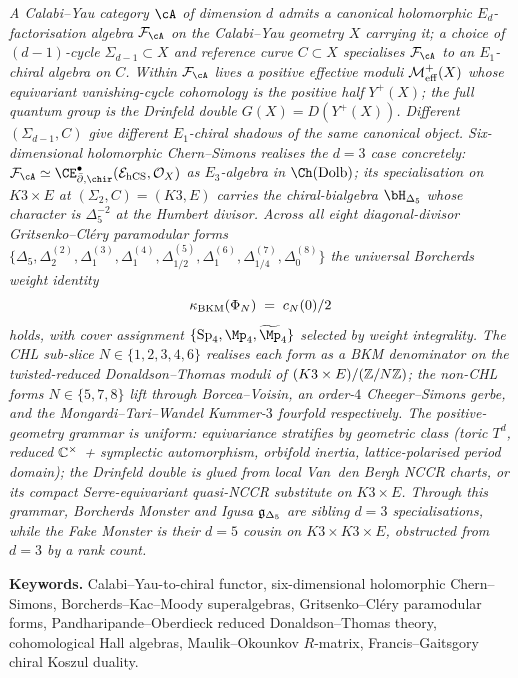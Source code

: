 \emph{A Calabi--Yau category $\cA$ of dimension $d$ admits a canonical
holomorphic $E_d$-factorisation algebra $\cF_\cA$ on the Calabi--Yau
geometry $X$ carrying it; a choice of $(d{-}1)$-cycle $\Sigma_{d-1} \subset X$
and reference curve $C \subset X$ specialises $\cF_\cA$ to an $E_1$-chiral
algebra on $C$. Within $\cF_\cA$ lives a positive effective moduli
$\mathcal{M}^{+}_{\mathrm{eff}}(X)$ whose equivariant vanishing-cycle cohomology is the positive
half $Y^+(X)$; the full quantum group is the Drinfeld double
$G(X) = D(Y^+(X))$. Different $(\Sigma_{d-1}, C)$ give different $E_1$-chiral
shadows of the same canonical object. Six-dimensional holomorphic
Chern--Simons realises the $d=3$ case concretely: $\cF_\cA \simeq
\CE^\bullet_{\bar\partial,\chir}(\cE_{\hCS}, \cO_X)$ as $E_3$-algebra in
$\Ch(\mathrm{Dolb})$; its specialisation on $K3 \times E$ at
$(\Sigma_2, C) = (K3, E)$ carries the chiral-bialgebra $\bH_{\Delta_5}$
whose character is $\Delta_5^{-2}$ at the Humbert divisor. Across all
eight diagonal-divisor Gritsenko--Cl\'ery paramodular forms
$\{\Delta_5, \Delta_2^{(2)}, \Delta_1^{(3)}, \Delta_1^{(4)},
\Delta_{1/2}^{(5)}, \Delta_1^{(6)}, \Delta_{1/4}^{(7)}, \Delta_0^{(8)}\}$
the universal Borcherds weight identity
\[
\kappa_{\mathrm{BKM}}(\Phi_N) \;=\; c_N(0)/2
\]
holds, with cover assignment $\{\Sp_4, \Mp_4, \widetilde{\Mp}_4\}$ selected
by weight integrality. The CHL sub-slice $N \in \{1, 2, 3, 4, 6\}$
realises each form as a BKM denominator on the twisted-reduced Donaldson--Thomas
moduli of $(K3 \times E)/(\mathbb{Z}/N\mathbb{Z})$; the non-CHL forms $N \in \{5, 7, 8\}$
lift through Borcea--Voisin, an order-$4$ Cheeger--Simons gerbe, and
the Mongardi--Tari--Wandel Kummer-$3$ fourfold respectively.
The positive-geometry grammar is uniform: equivariance stratifies
by geometric class (toric $T^d$, reduced $\mathbb{C}^\times$ + symplectic
automorphism, orbifold inertia, lattice-polarised period domain); the
Drinfeld double is glued from local Van~den Bergh NCCR charts, or its
compact Serre-equivariant quasi-NCCR substitute on $K3 \times E$.
Through this grammar, Borcherds Monster and Igusa $\mathfrak{g}_{\Delta_5}$ are
sibling $d{=}3$ specialisations, while the Fake Monster is their
$d{=}5$ cousin on $K3 \times K3 \times E$, obstructed from $d=3$ by a
rank count.}

\noindent\textbf{Keywords.} Calabi--Yau-to-chiral functor,
six-dimensional holomorphic Chern--Simons, Borcherds--Kac--Moody
superalgebras, Gritsenko--Cl\'ery paramodular forms, Pandharipande--Oberdieck
reduced Donaldson--Thomas theory, cohomological Hall algebras,
Maulik--Okounkov $R$-matrix, Francis--Gaitsgory chiral Koszul duality.
